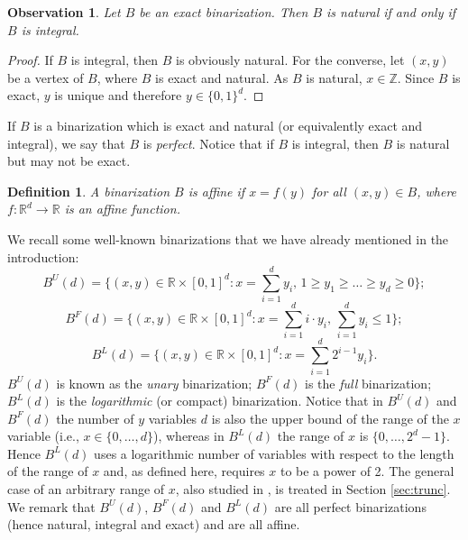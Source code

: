 \documentclass[11pt,a4paper]{article}
\newtheorem{definition}[theorem]{Definition}
\newtheorem{observation}[theorem]{Observation}
\newcommand{\R}{\mathbb{R}}
\newcommand{\Z}{\mathbb{Z}}
\newcommand{\1}{\textbf{1}}
\newcommand\marco[1]{\textcolor{red}{\textbf{ MDS:  #1}}}
\newcommand\michele[1]{\textcolor{blue}{\textbf{ MC:  #1}}}
\begin{document}
\begin{observation}\label{obs:twox}
Let $B$ be an exact binarization. Then $B$ is natural if and only if  $B$  is integral.
\end{observation}
\begin{proof} If  $B$ is integral, then $B$ is obviously natural. For the converse,  let $(x,y)$ be a vertex of $B$, where $B$ is exact and natural. As $B$ is natural, $x\in \Z$. Since $B$ is exact,  $y$ is unique and therefore $y\in \{0,1\}^d$.
\end{proof}


If $B$  is a  binarization which is exact and natural (or equivalently exact and integral), we say that $B$ is {\em perfect}.
 Notice that if $B$ is integral, then $B$ is natural but may not be exact. 

\begin{definition}\label{def:affine}
A binarization $B$ is \emph{affine} if $x=f(y)$ for all $(x,y)\in B$, where $f: \R^d\rightarrow \R$ is an affine function.
\end{definition}


We recall some well-known binarizations that we have already mentioned in the introduction:
$$B^U(d)=\{(x,y)\in \R\times [0,1]^d: x= \textstyle\sum_{i=1}^d y_i,\, 1\geq y_1\geq \dots \geq y_d\geq 0\};$$
$$B^F(d)=\{(x,y)\in \R\times [0,1]^d: x= \textstyle\sum_{i=1}^d i\cdot y_i, \, \textstyle\sum_{i=1}^d y_i\leq 1\};$$
$$B^L(d)=\{(x,y)\in \R\times [0,1]^d: x=\textstyle\sum_{i=1}^{d} 2^{i-1}y_i \}.$$
$B^U(d)$ is known as the \emph{unary} binarization; $B^F(d)$ is the \emph{full} binarization; $B^L(d)$ is the \emph{logarithmic} (or compact) binarization. Notice that in $B^U(d)$ and $B^F(d)$ the number of $y$ variables $d$ is also the upper bound of the range of the $x$ variable (i.e., $x\in\{0,\dots,d\}$), whereas in $B^L(d)$ the range of $x$ is $\{0,\dots, 2^d-1\}$. Hence $B^L(d)$ uses a logarithmic number of variables with respect to the length of the range of $x$ and, as defined here, requires $x$ to be a power of 2. The general case of an arbitrary range of $x$, also studied in \cite{dash2018binary}, is treated in Section \ref{sec:trunc}.
We remark that $B^U(d)$, $B^F(d)$ and $B^L(d)$ are all  perfect binarizations (hence natural, integral and exact) and are all affine.
\end{document}
